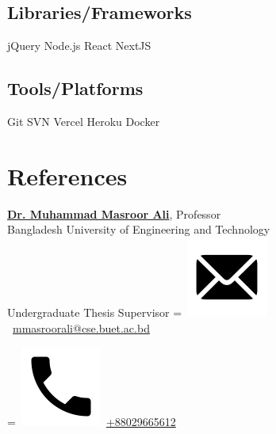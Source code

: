 \documentclass[]{plushcv}
\begin{document}
\begin{minipage}[t]{0.34\textwidth}
\subsection{Libraries/Frameworks}
\sectionsep
jQuery \textbullet{} Node.js \textbullet{} React \textbullet{} NextJS \\
\sectionsep
\subsection{Tools/Platforms}
\sectionsep
Git \textbullet{} SVN \textbullet{} Vercel \textbullet{} Heroku \textbullet{} Docker \\
\sectionsep


\sectionsep



\section{References} 
\href{https://cse.buet.ac.bd/faculty_list/detail/mmasroorali}{\textbf{Dr. Muhammad Masroor Ali}}, Professor 
\\Bangladesh University of Engineering and Technology \\
\textbullet{} Undergraduate Thesis Supervisor
\begingroup
{}=\hbox{
\includegraphics[scale=0.1,trim={0 1cm 0cm 0cm}]{icons/main/email.png}\hspace{0.3cm} \href{mailto:mmasroorali@cse.buet.ac.bd}{mmasroorali@cse.buet.ac.bd}
}
\parbox{\wd0}{}
\endgroup
\begingroup
{}=\hbox{
\includegraphics[scale=0.1,trim={0 1.25cm -0.4cm 0cm}]{icons/main/phone.png}\hspace{0.3cm}
\href{tel:+88029665612}{+88029665612}
}
\parbox{\wd0}{}\endgroup
\\


\end{minipage}
\end{document}
